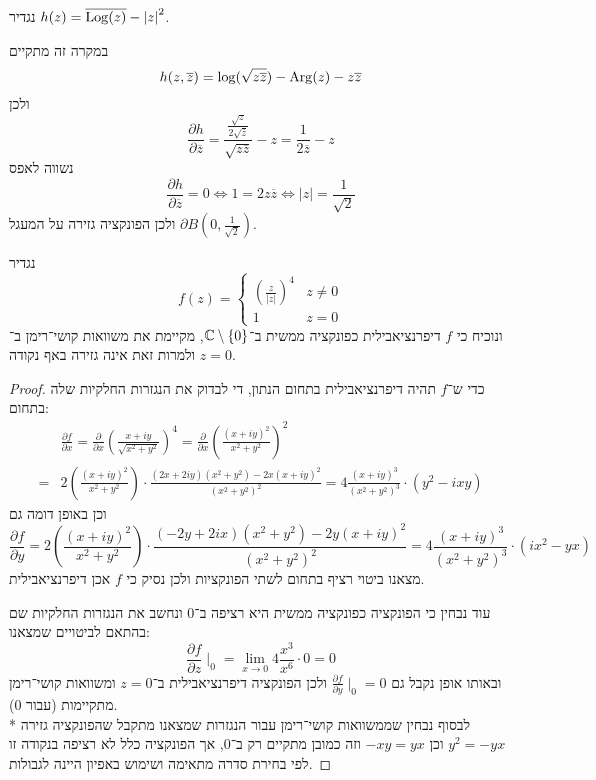 \Subquestion{}
נגדיר $h(z) = \overline{\operatorname{Log}(z)} - {|z|}^2$.
\begin{solution}
	במקרה זה מתקיים
	\[
		h(z, \overline{z}) = \log(\sqrt{z \overline{z}}) - \operatorname{Arg}(z) - z \overline{z}
	\]
	ולכן
	\[
		\frac{\partial h}{\partial \overline{z}}
		= \frac{\frac{\sqrt{z}}{2 \sqrt{\overline{z}}}}{\sqrt{z \overline{z}}} - z
		= \frac{1}{2 \overline{z}} - z
	\]
	נשווה לאפס
	\[
		\frac{\partial h}{\partial \overline{z}} = 0
		\iff 1 = 2 z \overline{z}
		\iff |z| = \frac{1}{\sqrt{2}}
	\]
	ולכן הפונקציה גזירה על המעגל $\partial B(0, \frac{1}{\sqrt{2}})$.
\end{solution}

\Question{}
נגדיר
\[
	f(z) = \begin{cases}
		{\left(\frac{z}{|z|}\right)}^4 & z \ne 0 \\
		1 & z = 0
	\end{cases}
\]
ונוכיח כי $f$ דיפרנציאבילית כפונקציה ממשית ב־$\mathbb{C} \setminus \{ 0 \}$, מקיימת את משוואות קושי־רימן ב־$z = 0$ ולמרות זאת אינה גזירה באף נקודה.
\begin{proof}
	כדי ש־$f$ תהיה דיפרנציאבילית בתחום הנתון, די לבדוק את הנגזרות החלקיות שלה בתחום:
	\begin{align*}
		& \frac{\partial f}{\partial x}
		= \frac{\partial}{\partial x} {\left(\frac{x + iy}{\sqrt{x^2 + y^2}}\right)}^4
		= \frac{\partial}{\partial x} {\left(\frac{{(x + iy)}^2}{x^2 + y^2}\right)}^2 \\
		= & 2 \left(\frac{{(x + iy)}^2}{x^2 + y^2}\right) \cdot \frac{(2x + 2iy)(x^2 + y^2) - 2x {(x + iy)}^2}{{(x^2 + y^2)}^2}
		= 4 \frac{{(x + iy)}^3}{{(x^2 + y^2)}^3} \cdot (y^2 - i x y)
	\end{align*}
	וכן באופן דומה גם
	\[
		\frac{\partial f}{\partial y}
		= 2 \left(\frac{{(x + iy)}^2}{x^2 + y^2}\right) \cdot \frac{(-2y + 2ix)(x^2 + y^2) - 2y {(x + iy)}^2}{{(x^2 + y^2)}^2}
		= 4 \frac{{(x + iy)}^3}{{(x^2 + y^2)}^3} \cdot (ix^2 - y x)
	\]
	מצאנו ביטוי רציף בתחום לשתי הפונקציות ולכן נסיק כי $f$ אכן דיפרנציאבילית.

	עוד נבחין כי הפונקציה כפונקציה ממשית היא רציפה ב־0 ונחשב את הנגזרות החלקיות שם בהתאם לביטויים שמצאנו:
	\[
		\frac{\partial f}{\partial z} \mid_0
		= \lim_{x \to 0} 4 \frac{x^3}{x^6} \cdot 0
		= 0
	\]
	ובאותו אופן נקבל גם $\frac{\partial f}{\partial y} \mid_0 = 0$ ולכן הפונקציה דיפרנציאבילית ב־$z = 0$ ומשוואות קושי־רימן מתקיימות (עבור 0). \\*
	לבסוף נבחין שממשוואות קושי־רימן עבור הנגזרות שמצאנו מתקבל שהפונקציה גזירה $y^2 = -yx$ וכן $-xy = yx$ וזה כמובן מתקיים רק ב־0, אך הפונקציה כלל לא רציפה בנקודה זו לפי בחירת סדרה מתאימה ושימוש באפיון היינה לגבולות.
\end{proof}

